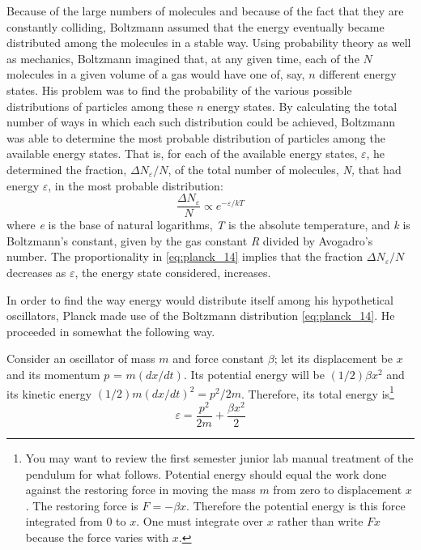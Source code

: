 Because of the large numbers of molecules and because of the fact that
they are constantly colliding, Boltzmann assumed that the energy
eventually became distributed among the molecules in a stable way. Using
probability theory as well as mechanics, Boltzmann imagined that, at any
given time, each of the $N$ molecules in a given volume of a gas would
have one of, say, $n$ different energy states. His problem was to
find the probability of the various possible distributions of particles
among these $n$ energy states. By calculating the total number of
ways in which each such distribution could be achieved, Boltzmann was
able to determine the most probable distribution of particles among the
available energy states. That is, for each of the available energy
states, $\varepsilon$, he determined the fraction,
$\Delta N_{\varepsilon}/N$, of the total number of molecules,
\emph{N,} that had energy $\varepsilon$, in the most probable distribution:
%
\begin{equation}\label{eq:planck_14}
\frac{\Delta N_{\varepsilon}}{N} \propto e^{-{\varepsilon}/kT} %
\end{equation}
%
where \emph{e} is the base of natural logarithms, \emph{T} is the
absolute temperature, and \emph{k} is Boltzmann's constant, given by the
gas constant \emph{R} divided by Avogadro's number. The proportionality
in \eqref{eq:planck_14} implies that the fraction $\Delta N_{\varepsilon}/N$
decreases as $\varepsilon$, the energy state considered, increases.

In order to find the way energy would distribute itself among his
hypothetical oscillators, Planck made use of the Boltzmann distribution
\eqref{eq:planck_14}. He proceeded in somewhat the following way.

Consider an oscillator of mass $m$ and force constant $\beta$; let
its displacement be $x$ and its momentum $p$ =
$m(dx/dt)$. Its potential energy will be
$(1/2)\beta x^2$ and its kinetic energy $(1/2)m(dx/dt)^{2} = p^{2}/2m$.
Therefore, its total energy is\footnote{You may want to review the
  first semester junior lab manual treatment of the pendulum for what
  follows. Potential energy should equal the work done against the
  restoring force in moving the mass $m$ from zero to displacement
  $x$. The restoring force is $F = - \beta x$. Therefore the
  potential energy is this force integrated from 0 to $x$. One must
  integrate over $x$ rather than write $Fx$ because the force
  varies with $x$.}
\begin{equation}\label{eq:planck_15}
\varepsilon = \frac{p^2}{2m} + \frac{\beta x^2}{2} %
\end{equation}

